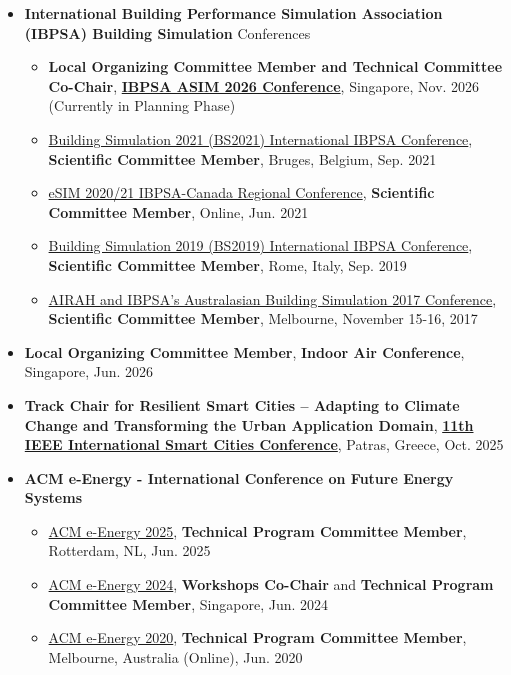 \documentclass[10pt,a4paper]{article}
\begin{document}
\begin{small}
\begin{itemize}
\item
\textbf{International Building Performance Simulation Association (IBPSA) Building Simulation} Conferences
\begin{itemize}
\item
\textbf{Local Organizing Committee Member and Technical Committee Co-Chair}, \href{https://asim2026.sg}{\textbf{IBPSA ASIM 2026 Conference}}, Singapore, Nov. 2026 (Currently in Planning Phase)
\item \href{https://bs2021.org/}{Building Simulation 2021 (BS2021) International IBPSA Conference}, \textbf{Scientific Committee Member}, Bruges, Belgium, Sep. 2021
\item \href{http://esim2020.sala.ubc.ca/}{eSIM 2020/21 IBPSA-Canada Regional Conference}, \textbf{Scientific Committee Member}, Online, Jun. 2021
\item \href{http://www.ibpsa.org/building-simulation-2019/}{Building Simulation 2019 (BS2019) International IBPSA Conference}, \textbf{Scientific Committee Member}, Rome, Italy, Sep. 2019
\item \href{https://www.ibpsa-australasia.org/post/australasian-building-simulation-conference-2017}{AIRAH and IBPSA’s Australasian Building Simulation 2017 Conference}, \textbf{Scientific Committee Member}, Melbourne, November 15-16, 2017
\end{itemize}

\item
\textbf{Local Organizing Committee Member}, \textbf{Indoor Air Conference}, Singapore, Jun. 2026

\item 
\textbf{Track Chair for Resilient Smart Cities – Adapting to Climate Change and Transforming the Urban Application Domain},
\href{https://isc2-2025.org}{\textbf{11th IEEE International Smart Cities Conference}}, Patras, Greece, Oct. 2025

\item
\textbf{ACM e-Energy - International Conference on Future Energy Systems}
\begin{itemize}
\item \href{https://energy.acm.org/conferences/eenergy/2025/}{ACM e-Energy 2025}, \textbf{Technical Program Committee Member}, Rotterdam, NL, Jun. 2025
\item \href{https://energy.acm.org/conferences/eenergy/2024/}{ACM e-Energy 2024}, \textbf{Workshops Co-Chair} and \textbf{Technical Program Committee Member}, Singapore, Jun. 2024
\item \href{https://energy.acm.org/conferences/eenergy/2020/}{ACM e-Energy 2020}, \textbf{Technical Program Committee Member}, Melbourne, Australia (Online), Jun. 2020
\end{itemize}


\end{itemize}
\end{small}
\end{document}
